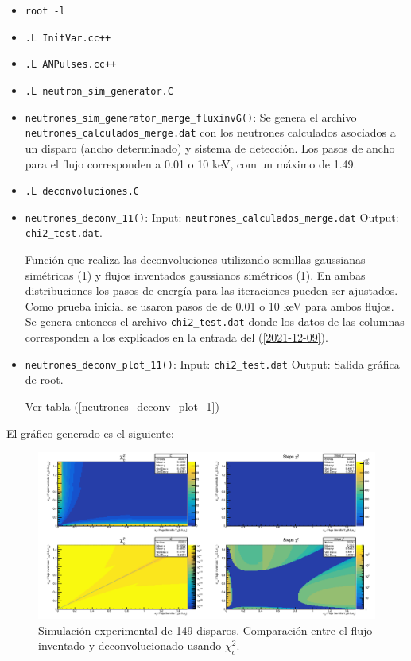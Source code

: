 \documentclass[11pt,letterpaper]{article}
\begin{document}
\begin{itemize}
\item \verb|root -l|
\item \verb|.L InitVar.cc++|
\item \verb|.L ANPulses.cc++|
\item \verb|.L neutron_sim_generator.C|
\item \verb|neutrones_sim_generator_merge_fluxinvG()|: Se genera el archivo \verb|neutrones_calculados_merge.dat| con los neutrones calculados asociados a un disparo (ancho determinado) y sistema de detección. Los pasos de ancho para el flujo corresponden a 0.01 o 10 keV, com un máximo de 1.49.
\item \verb|.L deconvoluciones.C|
\item \verb|neutrones_deconv_11()|: 
Input: \verb|neutrones_calculados_merge.dat| Output:  \verb|chi2_test.dat|.

Función que realiza las deconvoluciones utilizando semillas gaussianas simétricas (1) y flujos inventados gaussianos simétricos (1). En ambas distribuciones los pasos de energía para las iteraciones pueden ser ajustados. Como prueba inicial se usaron pasos de de 0.01 o 10 keV para ambos flujos. Se genera entonces el archivo \verb|chi2_test.dat| donde los datos de las columnas corresponden a los explicados en la entrada del (\ref{2021-12-09}).
\item \verb|neutrones_deconv_plot_11()|: Input: \verb|chi2_test.dat| Output: Salida gráfica de root.

Ver tabla (\ref{neutrones_deconv_plot_1})
\end{itemize}

El gráfico generado es el siguiente: 

\begin{figure}[H]
    \includegraphics[width=1.\textwidth]{img/chi2_test_1-149_fluxseed_G_fluxinv_G_11.png}
    \centering
     \cprotect\caption{Simulación experimental de 149 disparos. Comparación entre el flujo inventado y deconvolucionado usando $\chi_c^2$.}
\label{neutrones_deconv_plot_11}
\end{figure}
\end{document}
